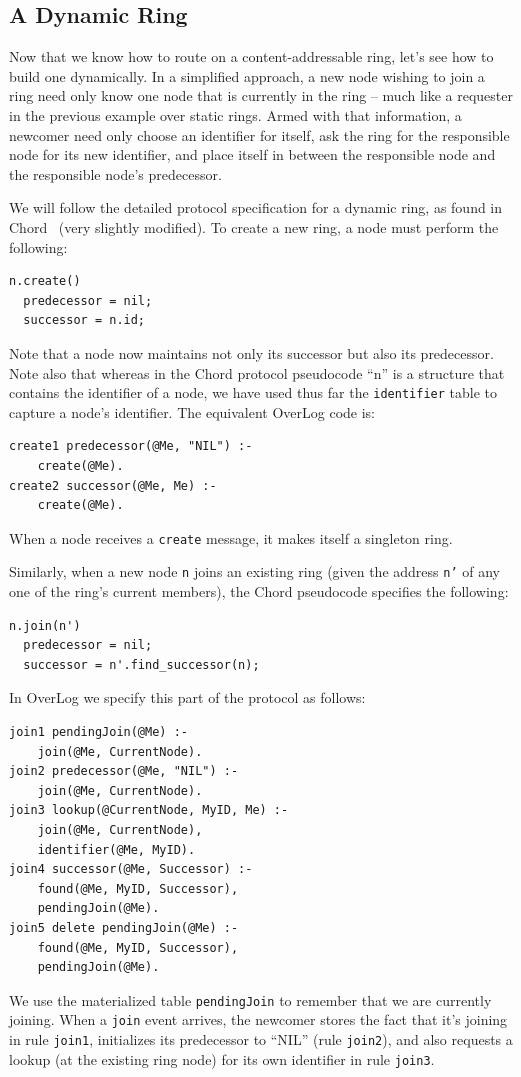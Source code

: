 \documentclass{article}
\begin{document}
\subsection{A Dynamic Ring}
\label{sec:dynamicRing}
Now that we know how to route on a content-addressable ring, let's see
how to build one dynamically.  In a simplified approach, a new node
wishing to join a ring need only know one node that is currently in the
ring -- much like a requester in the previous example over static
rings.  Armed with that information, a newcomer need only choose an
identifier for itself, ask the ring for the responsible node for its new
identifier, and place itself in between the responsible node and the
responsible node's predecessor.

We will follow the detailed protocol specification for a dynamic ring,
as found in Chord~\cite{Stoica2003} (very slightly modified). To create a new ring, a node must
perform the following:
\begin{verbatim}
n.create()
  predecessor = nil;
  successor = n.id;
\end{verbatim}
Note that a node now maintains not only its successor but also its
predecessor. Note also that whereas in the Chord protocol pseudocode
``n'' is a structure that contains the identifier of a node, we have
used thus far the \lstinline$identifier$ table to capture a node's
identifier.  The equivalent OverLog code is:
\begin{lstlisting}
create1 predecessor(@Me, "NIL") :-
	create(@Me).
create2 successor(@Me, Me) :-
	create(@Me).
\end{lstlisting}
When a node receives a \lstinline$create$ message, it makes itself a
singleton ring.

Similarly, when a new node \texttt{n} joins an existing ring (given the
address \texttt{n'} of any one of the ring's current members), the Chord pseudocode
specifies the following:
\begin{verbatim}
n.join(n')
  predecessor = nil;
  successor = n'.find_successor(n);
\end{verbatim}
In OverLog we specify this part of the protocol as follows:
\begin{lstlisting}
join1 pendingJoin(@Me) :-
	join(@Me, CurrentNode).
join2 predecessor(@Me, "NIL") :-
	join(@Me, CurrentNode).
join3 lookup(@CurrentNode, MyID, Me) :-
	join(@Me, CurrentNode),
	identifier(@Me, MyID).
join4 successor(@Me, Successor) :-
	found(@Me, MyID, Successor),
	pendingJoin(@Me).
join5 delete pendingJoin(@Me) :-
	found(@Me, MyID, Successor),
	pendingJoin(@Me).
\end{lstlisting}
We use the materialized table \lstinline$pendingJoin$ to remember that
we are currently joining.  When a \lstinline$join$ event arrives, the
newcomer stores the fact that it's joining in rule \lstinline$join1$,
initializes its predecessor to ``NIL'' (rule \lstinline$join2$), and
also requests a lookup (at the existing ring node) for its own
identifier in rule \lstinline$join3$.
\end{document}
